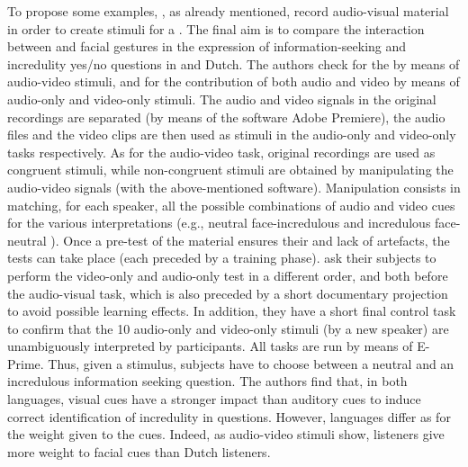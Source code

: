 \documentclass[output=paper]{langsci/langscibook}
\begin{document}
To propose some examples,  \citet{CrespoSendra2013}, as already mentioned, record audio-visual material in order to create stimuli for a . The final aim is to compare the interaction between  and facial gestures in the expression of information-seeking and incredulity yes\slash no questions in  and Dutch. The authors check for the  by means of audio-video stimuli, and for the contribution of both audio and video by means of audio-only and video-only stimuli. The audio and video signals in the original recordings are separated (by means of the software Adobe Premiere), the audio files and the video clips are then used as stimuli in the audio-only and video-only tasks respectively. As for the audio-video task, original recordings are used as congruent stimuli, while non-congruent stimuli are obtained by manipulating the audio-video signals (with the above-mentioned software). Manipulation consists in matching, for each speaker, all the possible combinations of audio and video cues for the various interpretations (e.g., neutral face-incredulous  and incredulous face-neutral ). Once  a pre-test of the material ensures their  and lack of artefacts, the tests can take place (each preceded by a training phase).  \citet{CrespoSendra2013} ask their subjects to perform the video-only and audio-only test in a different order, and both before the audio-visual task, which is also preceded by a short documentary projection to avoid possible learning effects. In addition, they have a short final control task to confirm that the 10 audio-only and video-only stimuli (by a new speaker) are unambiguously interpreted by participants. All tasks are run by means of E-Prime. Thus, given a stimulus, subjects have to choose between a neutral and an incredulous information seeking question. The authors find that, in both languages, visual cues have a stronger impact than auditory cues to induce correct identification of incredulity in questions. However, languages differ as for the weight given to the cues. Indeed, as audio-video stimuli show,  listeners give more weight to facial cues than Dutch listeners. 
\end{document}
